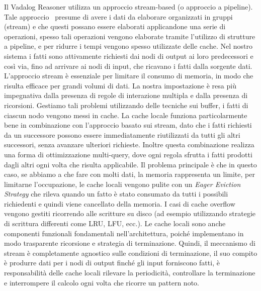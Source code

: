 Il Vadalog Reasoner utilizza un approccio stream-based (o approccio a pipeline). Tale approccio~\cite{WIKI:STREAM} presume di avere i dati da elaborare organizzati in gruppi (stream) e che questi possano essere elaborati applicandone una serie di operazioni, spesso tali operazioni vengono elaborate tramite l'utilizzo di strutture a pipeline, e per ridurre i tempi vengono spesso utilizzate delle cache. \newline
Nel nostro sistema i fatti sono attivamente richiesti dai nodi di output ai loro predecessori e così via, fino ad arrivare ai nodi di input, che ricavano i fatti dalla sorgente dati. L'approccio stream è essenziale per limitare il consumo di memoria, in modo che risulta efficace per grandi volumi di dati. \newline
La nostra impostazione è resa più impegnativa dalla presenza di regole di interazione multipla e dalla presenza di ricorsioni. \newline
Gestiamo tali problemi utilizzando delle tecniche sui buffer, i fatti di ciascun nodo vengono messi in cache. \newline
La cache locale funziona particolarmente bene in combinazione con l'approccio basato sui stream, dato che i fatti richiesti da un successore possono essere immediatamente riutilizzati da tutti gli altri successori, senza avanzare ulteriori richieste. Inoltre questa combinazione realizza una forma di ottimizzazione multi-query, dove ogni regola sfrutta i fatti prodotti dagli altri ogni volta che risulta applicabile. \newline
Il problema principale è che in questo caso, se abbiamo a che fare con molti dati, la memoria rappresenta un limite, per limitarne l'occupazione, le cache locali vengono pulite con un \textit{Eager Eviction Strategy} che rileva quando un fatto è stato consumato da tutti i possibili richiedenti e quindi viene cancellato della memoria. \newline
I casi di cache overflow vengono gestiti ricorrendo alle scritture su disco (ad esempio utilizzando strategie di scrittura differenti come LRU, LFU, ecc.). \newline
Le cache locali sono anche componenti funzionali fondamentali nell'architettura, poiché implementano in modo trasparente ricorsione e strategia di terminazione. \newline
Quindi, il meccanismo di stream è completamente agnostico sulle condizioni di terminazione, il suo compito è produrre dati per i nodi di output finché gli input forniscono fatti, è responsabilità delle cache locali rilevare la periodicità, controllare la terminazione e interrompere il calcolo ogni volta che ricorre un pattern noto. \newline
